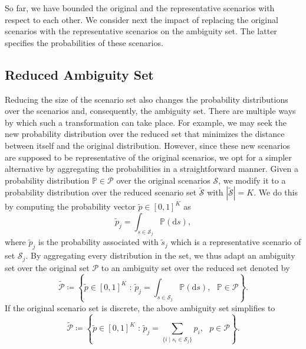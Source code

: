 \documentclass{article}
\newtheorem{remark}{Remark}
\newcommand{\mP}{\mathcal{P}}
\newcommand{\mS}{\mathcal{S}}
\newcommand{\tS}{\tilde{\mS}}
\newcommand{\newscen}[1]{\tilde{s}_{#1}}%
\newcommand{\prob}{\mathbb{P}}
\begin{document}
So far, we have bounded the original and the representative scenarios
with respect to each other. 
We consider next the impact of replacing the original scenarios with the representative scenarios on the ambiguity set. The latter specifies the probabilities of these scenarios. 


\subsection{Reduced Ambiguity Set}
Reducing the size of the scenario set also changes the probability distributions over the scenarios and, consequently, the ambiguity set.
There are multiple ways by which such a transformation can take place. 
For example, we may seek the new probability distribution over the reduced set that minimizes the distance between itself and the original distribution. 
However, since these new scenarios are supposed to be representative of the original scenarios, we opt for a simpler alternative by aggregating the probabilities in a straightforward manner. 
Given a probability distribution \(\prob\in \mP\) over the original scenarios \(\mS\), we modify it to a probability distribution over the reduced scenario set \(\tS\)  with $|\tS|=K$.
We do this by computing the probability vector \(\tilde{p}\in [0,1]^K\) as %
\begin{equation*}
	\tilde{p}_j = \int_{s\in \mS_j} \prob(\text{d}s),
\end{equation*}
where \(\tilde{p}_j\) is the probability associated with
\(\newscen{j}\) which is a representative scenario of set
\(\mS_j\). %
By aggregating every distribution in the set, we thus adapt an ambiguity set over the original set \(\mP\) to an ambiguity set over the reduced set denoted by
\begin{equation}
	\tilde{\mP} \coloneqq \left\{ \tilde{p}\in [0,1]^{K} \text{ : }  \tilde{p}_j = \int_{s\in \mS_j} \prob(\text{d}s),\text{ } \prob \in \mP \right\}. \label{Eq:ambiguity_reduced}
\end{equation}
If the original scenario set is discrete, the above ambiguity set simplifies to
\begin{equation*}
	\tilde{\mP} \coloneqq \left\{ \tilde{p}\in [0,1]^{K} \text{ : }  \tilde{p}_j = \textstyle\sum_{\{i \mid s_i\in \mS_j\}} p_i,\text{ } p \in \mP \right\}.
\end{equation*}
\end{document}
